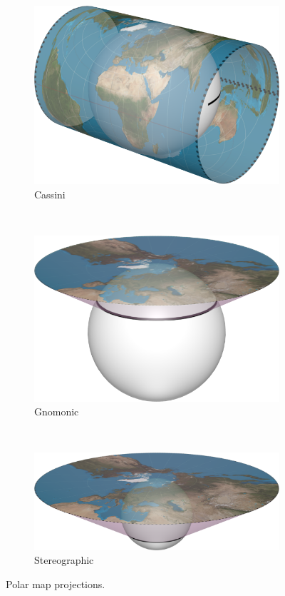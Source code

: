 \begin{figure}[htbp]
    \centering
    \begin{subfigure}[b]{0.3\textwidth}
        \includegraphics[width=\textwidth]{figures/map_projection/projection_cassini.png}
    	\caption{Cassini}
    \end{subfigure}
    ~
    \begin{subfigure}[b]{0.3\textwidth}
        \includegraphics[width=\textwidth]{figures/map_projection/projection_gnomonic.png}
        \caption{Gnomonic}
    \end{subfigure}
    ~
    \begin{subfigure}[b]{0.3\textwidth}
        \includegraphics[width=\textwidth]{figures/map_projection/projection_stereographic.png}
    	\caption{Stereographic}
    \end{subfigure}
    \caption{Polar map projections.}
    \label{fig:proj_polar}
\end{figure}

